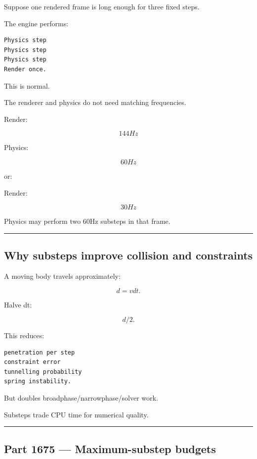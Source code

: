 \hypertarget{06-engine-ii-ch037-part-1674-multiple-physics-substeps}{}

Suppose one rendered frame is long enough for three fixed steps.

The engine performs:

\begin{verbatim}
Physics step
Physics step
Physics step
Render once.
\end{verbatim}

This is normal.

The renderer and physics do not need matching frequencies.

Render:

\[
144Hz
\]

Physics:

\[
60Hz
\]

or:

Render:

\[
30Hz
\]

Physics may perform two 60Hz substeps in that frame.

\begin{center}\rule{0.5\linewidth}{0.5pt}\end{center}

\subsection{Why substeps improve collision and constraints}\label{06-engine-ii-ch037-why-substeps-improve-collision-and-constraints}

\hypertarget{06-engine-ii-ch037-why-substeps-improve-collision-and-constraints}{}

A moving body travels approximately:

\[
d=vdt.
\]

Halve dt:

\[
d/2.
\]

This reduces:

\begin{verbatim}
penetration per step
constraint error
tunnelling probability
spring instability.
\end{verbatim}

But doubles broadphase/narrowphase/solver work.

Substeps trade CPU time for numerical quality.

\begin{center}\rule{0.5\linewidth}{0.5pt}\end{center}

\subsection{Part 1675 --- Maximum-substep budgets}\label{06-engine-ii-ch037-part-1675-maximum-substep-budgets}

